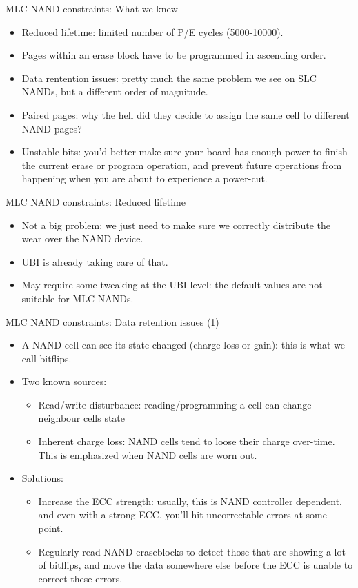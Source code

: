 \documentclass[aspectratio=169,obeyspaces,spaces,hyphens,dvipsnames]{beamer}
\begin{document}
\begin{frame}{MLC NAND constraints: What we knew}
  \begin{itemize}
  \item Reduced lifetime: limited number of P/E cycles (5000-10000).
  \item Pages within an erase block have to be programmed in ascending
	order.
  \item Data rentention issues: pretty much the same problem we see
	on SLC NANDs, but a different order of magnitude.
  \item Paired pages: why the hell did they decide to assign the same
	cell to different NAND pages?
  \item Unstable bits: you'd better make sure your board has enough
	power to finish the current erase or program operation, and
	prevent future operations from happening when you are about to
	experience a power-cut.
  \end{itemize}
\end{frame}

\begin{frame}{MLC NAND constraints: Reduced lifetime}
  \begin{itemize}
  \item Not a big problem: we just need to make sure we correctly
	distribute the wear over the NAND device.
  \item UBI is already taking care of that.
  \item May require some tweaking at the UBI level: the default values
	are not suitable for MLC NANDs.
  \end{itemize}
\end{frame}

\begin{frame}{MLC NAND constraints: Data retention issues (1)}
  \begin{itemize}
  \item A NAND cell can see its state changed (charge loss or gain):
	this is what we call bitflips.
  \item Two known sources:
    \begin{itemize}
    \item Read/write disturbance: reading/programming a cell can
	  change neighbour cells state
    \item Inherent charge loss: NAND cells tend to loose their
	  charge over-time. This is emphasized when NAND cells are
	  worn out.
    \end{itemize}
  \item Solutions:
    \begin{itemize}
    \item Increase the ECC strength: usually, this is NAND controller
	  dependent, and even with a strong ECC, you'll hit
	  uncorrectable errors at some point.
    \item Regularly read NAND eraseblocks to detect those that are
	  showing a lot of bitflips, and move the data somewhere else
	  before the ECC is unable to correct these errors.
    \end{itemize}
  \end{itemize}
\end{frame}
\end{document}
